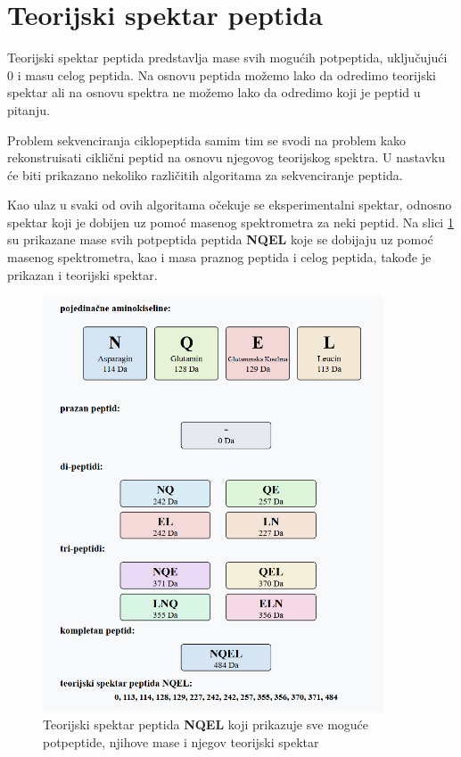 \documentclass[12pt,oneside]{memoir}
\begin{document}
\section{Teorijski spektar peptida}
Teorijski spektar peptida predstavlja mase svih mogućih potpeptida, uključujući 0 i masu celog peptida. Na osnovu peptida možemo lako da odredimo teorijski spektar ali na osnovu spektra ne možemo lako da odredimo koji je peptid u pitanju.

Problem sekvenciranja ciklopeptida samim tim se svodi na problem kako rekonstruisati ciklični peptid na osnovu njegovog teorijskog spektra. U nastavku će biti prikazano nekoliko različitih algoritama za sekvenciranje peptida.

Kao ulaz u svaki od ovih algoritama očekuje se eksperimentalni spektar, odnosno spektar koji je dobijen uz pomoć masenog spektrometra za neki peptid. Na slici \ref{fig:spektar} su prikazane mase svih potpeptida peptida \textbf{NQEL} koje se dobijaju uz pomoć masenog spektrometra, kao i masa praznog peptida i celog peptida, takođe je prikazan i teorijski spektar.

\begin{figure}[h]
  \centering
  \includegraphics[width=0.9\textwidth]{images/peptide-theoretical-spectrum.png}
  \caption{Teorijski spektar peptida \textbf{NQEL} koji prikazuje sve moguće potpeptide, njihove mase i njegov teorijski spektar}
  \label{fig:spektar}
\end{figure}
\end{document}
